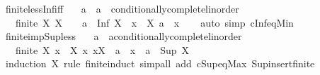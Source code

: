 \begin{isabellebody}
\endisatagproof
{\isafoldproof}%
%
\isadelimproof
\isanewline
%
\endisadelimproof
\isanewline
{}\isamarkupfalse%
\ finite{\isacharunderscore}{\kern0pt}less{\isacharunderscore}{\kern0pt}Inf{\isacharunderscore}{\kern0pt}iff{\isacharcolon}{\kern0pt}\isanewline
\ \ \ a\ {\isacharcolon}{\kern0pt}{\isacharcolon}{\kern0pt}\ {\isachardoublequoteopen}{\isacharprime}{\kern0pt}a\ {\isacharcolon}{\kern0pt}{\isacharcolon}{\kern0pt}\ conditionally{\isacharunderscore}{\kern0pt}complete{\isacharunderscore}{\kern0pt}linorder{\isachardoublequoteclose}\isanewline
\ \ \ {\isachardoublequoteopen}{\isasymlbrakk}finite\ X{\isacharsemicolon}{\kern0pt}\ X\ {\isasymnoteq}\ {\isacharbraceleft}{\kern0pt}{\isacharbraceright}{\kern0pt}{\isasymrbrakk}\ {\isasymLongrightarrow}\ a\ {\isacharless}{\kern0pt}\ Inf\ X\ {\isasymlongleftrightarrow}\ {\isacharparenleft}{\kern0pt}{\isasymforall}x\ {\isasymin}\ X{\isachardot}{\kern0pt}\ a\ {\isacharless}{\kern0pt}\ x{\isacharparenright}{\kern0pt}{\isachardoublequoteclose}\isanewline
%
\isadelimproof
\ \ %
\endisadelimproof
%
\isatagproof
{}\isamarkupfalse%
\ {\isacharparenleft}{\kern0pt}auto\ simp{\isacharcolon}{\kern0pt}\ cInf{\isacharunderscore}{\kern0pt}eq{\isacharunderscore}{\kern0pt}Min{\isacharparenright}{\kern0pt}%
\endisatagproof
{\isafoldproof}%
%
\isadelimproof
\isanewline
%
\endisadelimproof
\isanewline
{}\isamarkupfalse%
\ finite{\isacharunderscore}{\kern0pt}imp{\isacharunderscore}{\kern0pt}Sup{\isacharunderscore}{\kern0pt}less{\isacharcolon}{\kern0pt}\isanewline
\ \ \ a\ {\isacharcolon}{\kern0pt}{\isacharcolon}{\kern0pt}\ {\isachardoublequoteopen}{\isacharprime}{\kern0pt}a{\isacharcolon}{\kern0pt}{\isacharcolon}{\kern0pt}conditionally{\isacharunderscore}{\kern0pt}complete{\isacharunderscore}{\kern0pt}linorder{\isachardoublequoteclose}\isanewline
\ \ \ {\isachardoublequoteopen}{\isasymlbrakk}finite\ X{\isacharsemicolon}{\kern0pt}\ x\ {\isasymin}\ X{\isacharsemicolon}{\kern0pt}\ {\isasymAnd}x{\isachardot}{\kern0pt}\ x{\isasymin}X\ {\isasymLongrightarrow}\ a\ {\isachargreater}{\kern0pt}\ x{\isasymrbrakk}\ {\isasymLongrightarrow}\ a\ {\isachargreater}{\kern0pt}\ Sup\ X{\isachardoublequoteclose}\isanewline
%
\isadelimproof
\ \ %
\endisadelimproof
%
\isatagproof
{}\isamarkupfalse%
\ {\isacharparenleft}{\kern0pt}induction\ X\ rule{\isacharcolon}{\kern0pt}\ finite{\isacharunderscore}{\kern0pt}induct{\isacharparenright}{\kern0pt}\ {\isacharparenleft}{\kern0pt}simp{\isacharunderscore}{\kern0pt}all\ add{\isacharcolon}{\kern0pt}\ cSup{\isacharunderscore}{\kern0pt}eq{\isacharunderscore}{\kern0pt}Max\ Sup{\isacharunderscore}{\kern0pt}insert{\isacharunderscore}{\kern0pt}finite{\isacharparenright}{\kern0pt}%

\end{isabellebody}
